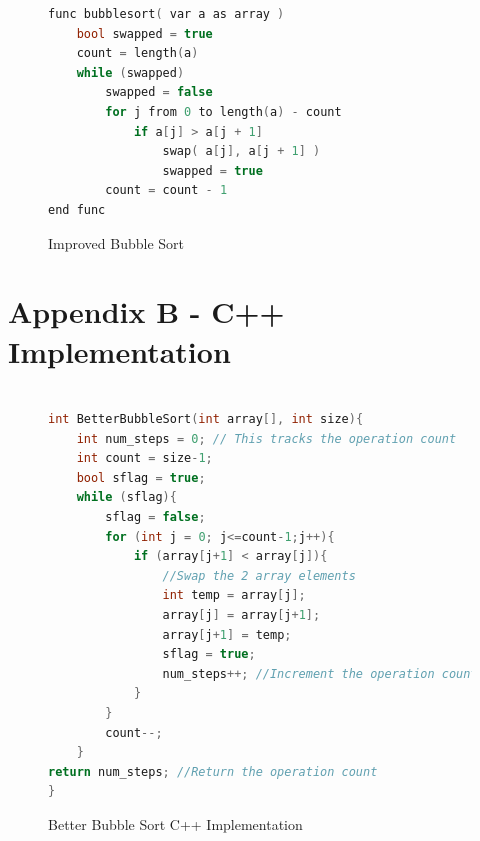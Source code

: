 \documentclass[]{article}
\begin{document}
\begin{figure}[H]\label{BetterBubbleSort}
	\caption{Improved Bubble Sort}
\begin{lstlisting}[language=c++]
func bubblesort( var a as array )
	bool swapped = true
	count = length(a)
	while (swapped)
		swapped = false
		for j from 0 to length(a) - count
			if a[j] > a[j + 1]
				swap( a[j], a[j + 1] )
				swapped = true
		count = count - 1
end func
\end{lstlisting}
\end{figure}
\section{Appendix B - C++ Implementation}
\begin{figure}[H]\label{BetterBubbleSortImplemented}
	\caption{Better Bubble Sort C++ Implementation}
	\begin{lstlisting}[language=c++]

int BetterBubbleSort(int array[], int size){
	int num_steps = 0; // This tracks the operation count
	int count = size-1;
	bool sflag = true;
	while (sflag){
		sflag = false;
		for (int j = 0; j<=count-1;j++){
			if (array[j+1] < array[j]){
				//Swap the 2 array elements
				int temp = array[j];
				array[j] = array[j+1];
				array[j+1] = temp;
				sflag = true;
				num_steps++; //Increment the operation counter
			}
		}
		count--;
	}
return num_steps; //Return the operation count
}
	\end{lstlisting}
\end{figure}
\end{document}
